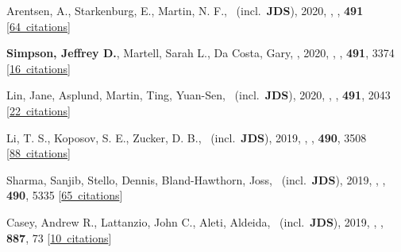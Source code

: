 \item[{\color{numcolor}\scriptsize39}] Arentsen, A., Starkenburg, E., Martin, N. F., \etal\ (incl.\ \textbf{JDS}), 2020, , \mnras, \textbf{491} [\href{https://ui.adsabs.harvard.edu/#abs/2020MNRAS.491L..11A}{64~citations}]

\item[{\color{numcolor}\scriptsize38}] \textbf{Simpson, Jeffrey D.}, Martell, Sarah L., Da Costa, Gary, \etal, 2020, , \mnras, \textbf{491}, 3374 [\href{https://ui.adsabs.harvard.edu/#abs/2020MNRAS.491.3374S}{16~citations}]

\item[{\color{numcolor}\scriptsize37}] Lin, Jane, Asplund, Martin, Ting, Yuan-Sen, \etal\ (incl.\ \textbf{JDS}), 2020, , \mnras, \textbf{491}, 2043 [\href{https://ui.adsabs.harvard.edu/#abs/2020MNRAS.491.2043L}{22~citations}]

\item[{\color{numcolor}\scriptsize36}] Li, T. S., Koposov, S. E., Zucker, D. B., \etal\ (incl.\ \textbf{JDS}), 2019, , \mnras, \textbf{490}, 3508 [\href{https://ui.adsabs.harvard.edu/#abs/2019MNRAS.490.3508L}{88~citations}]

\item[{\color{numcolor}\scriptsize35}] Sharma, Sanjib, Stello, Dennis, Bland-Hawthorn, Joss, \etal\ (incl.\ \textbf{JDS}), 2019, , \mnras, \textbf{490}, 5335 [\href{https://ui.adsabs.harvard.edu/#abs/2019MNRAS.490.5335S}{65~citations}]

\item[{\color{numcolor}\scriptsize34}] Casey, Andrew R., Lattanzio, John C., Aleti, Aldeida, \etal\ (incl.\ \textbf{JDS}), 2019, , \apj, \textbf{887}, 73 [\href{https://ui.adsabs.harvard.edu/#abs/2019ApJ...887...73C}{10~citations}]

